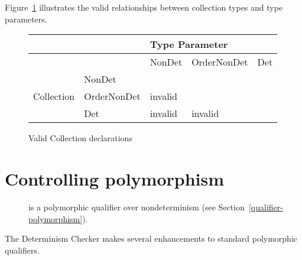 Figure~\ref{fig-determinism-collections} illustrates the valid
relationships between collection types and type parameters.

\begin{figure}
  \centering
  \begin{tabular}{|l|l|l|l|l|}
    \hline
    &   &  \multicolumn{3}{l|}{Type Parameter}                                                                       \\ \hline
    &             & NonDet                                     & OrderNonDet              & Det \\ \cline{2-5}
              & NonDet &                                                 &                          &     \\ \cline{2-5}
Collection    & OrderNonDet &   invalid  &                          &     \\ \cline{2-5}
              & Det         &   invalid               &    invalid  &     \\ \hline
  \end{tabular}
  \caption{Valid Collection declarations}
  \label{fig-determinism-collections}
\end{figure}





\section{Controlling polymorphism\label{determinism-polymorphism}}

\begin{description}
\item[] is a
  polymorphic qualifier over nondeterminism (see Section~\ref{qualifier-polymorphism}).
\end{description}

The Determinism Checker makes
several enhancements to standard polymorphic qualifiers.


